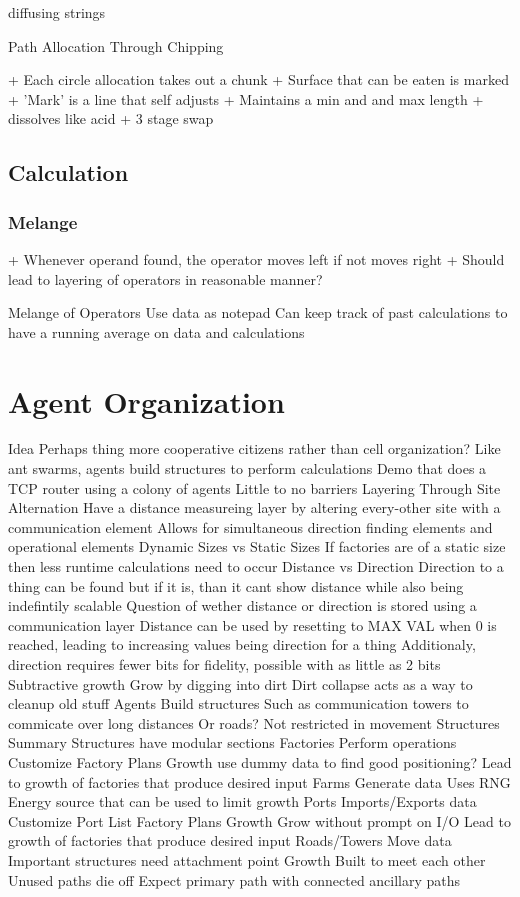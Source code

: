 \documentclass[article,12pt,oneside]{memoir}
\begin{document}
diffusing strings

Path Allocation Through Chipping

+ Each circle allocation takes out a chunk
+ Surface that can be eaten is marked
+ 'Mark' is a line that self adjusts
+ Maintain​s a min and and max length
+ dissolves like acid
+ 3 stage swap


\section{Calculation}


\subsection{Melange}

+ Whenever operand found, the operator moves left if not moves right
+ Should lead to layering of operators in reasonable manner?

Melange of Operators Use data as notepad
Can keep track of past calculations to have a running average on data and calculations


\pagebreak
\chapter{Agent Organization}

Idea
Perhaps thing more cooperative citizens rather than cell organization?
Like ant swarms, agents build structures to perform calculations
Demo that does a TCP router using a colony of agents
Little to no barriers
Layering Through Site Alternation
Have a distance measureing layer by altering every-other site with a communication element
Allows for simultaneous direction finding elements and operational elements
Dynamic Sizes vs Static Sizes
If factories are of a static size then less runtime calculations need to occur
Distance vs Direction
Direction to a thing can be found but if it is, than it cant show distance while also being indefintily scalable
Question of wether distance or direction is stored using a communication layer
Distance can be used by resetting to MAX VAL when 0 is reached, leading to increasing values being direction for a thing
Additionaly, direction requires fewer bits for fidelity, possible with as little as 2 bits
Subtractive growth
Grow by digging into dirt
Dirt collapse acts as a way to cleanup old stuff
Agents
Build structures
Such as communication towers to commicate over long distances
Or roads?
Not restricted in movement
Structures
Summary
Structures have modular sections
Factories
Perform operations
Customize
Factory Plans
Growth
use dummy data to find good positioning?
Lead to growth of factories that produce desired input
Farms
Generate data
Uses
RNG
Energy source that can be used to limit growth
Ports
Imports/Exports data
Customize 
Port List
Factory Plans
Growth
Grow without prompt on I/O
Lead to growth of factories that produce desired input
Roads/Towers
Move data
Important structures need attachment point
Growth
Built to meet each other
Unused paths die off
Expect primary path with connected ancillary paths
\end{document}
